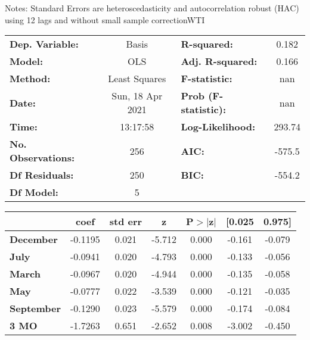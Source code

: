 Notes: \newline
 [1] Standard Errors are heteroscedasticity and autocorrelation robust (HAC) using 12 lags and without small sample correctionWTI\begin{center}
\begin{tabular}{lclc}
\toprule
\textbf{Dep. Variable:}    &      Basis       & \textbf{  R-squared:         } &     0.182   \\
\textbf{Model:}            &       OLS        & \textbf{  Adj. R-squared:    } &     0.166   \\
\textbf{Method:}           &  Least Squares   & \textbf{  F-statistic:       } &       nan   \\
\textbf{Date:}             & Sun, 18 Apr 2021 & \textbf{  Prob (F-statistic):} &      nan    \\
\textbf{Time:}             &     13:17:58     & \textbf{  Log-Likelihood:    } &    293.74   \\
\textbf{No. Observations:} &         256      & \textbf{  AIC:               } &    -575.5   \\
\textbf{Df Residuals:}     &         250      & \textbf{  BIC:               } &    -554.2   \\
\textbf{Df Model:}         &           5      & \textbf{                     } &             \\
\bottomrule
\end{tabular}
\begin{tabular}{lcccccc}
                   & \textbf{coef} & \textbf{std err} & \textbf{z} & \textbf{P$> |$z$|$} & \textbf{[0.025} & \textbf{0.975]}  \\
\midrule
\textbf{December}  &      -0.1195  &        0.021     &    -5.712  &         0.000        &       -0.161    &       -0.079     \\
\textbf{July}      &      -0.0941  &        0.020     &    -4.793  &         0.000        &       -0.133    &       -0.056     \\
\textbf{March}     &      -0.0967  &        0.020     &    -4.944  &         0.000        &       -0.135    &       -0.058     \\
\textbf{May}       &      -0.0777  &        0.022     &    -3.539  &         0.000        &       -0.121    &       -0.035     \\
\textbf{September} &      -0.1290  &        0.023     &    -5.579  &         0.000        &       -0.174    &       -0.084     \\
\textbf{3 MO}      &      -1.7263  &        0.651     &    -2.652  &         0.008        &       -3.002    &       -0.450     \\

\end{tabular}
\end{center}
